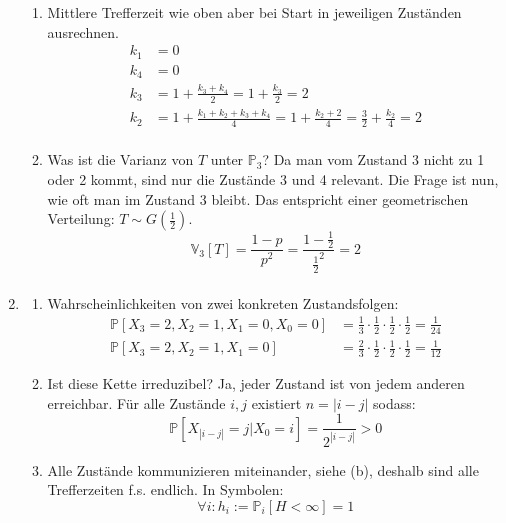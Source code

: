 \documentclass[a4paper,11pt,notitlepage,fullpage]{article}
\newcommand{\p}{\mathbb P}
\newcommand{\pp}[1]{\mathbb P\left[#1\right]}
\newcommand{\ppp}[2]{\mathbb P_#1\left[#2\right]}
\newcommand{\V}{\mathbb V}
\begin{document}
\begin{enumerate}
\begin{enumerate}
\item Mittlere Trefferzeit wie oben aber bei Start in jeweiligen Zuständen ausrechnen.
\begin{align*}
k_1 &= 0 \\
k_4 &= 0 \\
k_3 &= 1 + \frac{k_3 + k_4}{2} = 1 + \frac{k_3}{2} = 2\\
k_2 &= 1 + \frac{k_1 + k_2 + k_3 + k_4}{4} = 1 + \frac{k_2 + 2}{4} = \frac{3}{2} + \frac{k_2}{4} = 2\\
\end{align*}

\item Was ist die Varianz von $T$ unter $\p_3$? Da man vom Zustand 3 nicht zu 1 oder 2 kommt, sind nur die Zustände 3 und 4 relevant. Die Frage ist nun, wie oft man im Zustand 3 bleibt. Das entspricht einer geometrischen Verteilung: $T \sim G\left(\frac{1}{2}\right)$. $$\V_3\left[T\right] = \frac{1-p}{p^2} = \frac{1-\frac{1}{2}}{\frac{1}{2}^2} = 2$$
\begin{align*}
\end{align*}
\end{enumerate}

\item 
\begin{enumerate}
\item Wahrscheinlichkeiten von zwei konkreten Zustandsfolgen:
\begin{align*}
\pp{X_3 = 2, X_2 = 1, X_1 = 0, X_0 = 0} &= \frac{1}{3}\cdot\frac{1}{2}\cdot\frac{1}{2}\cdot\frac{1}{2} = \frac{1}{24} \\
\pp{X_3 = 2, X_2 = 1, X_1 = 0} &= \frac{2}{3}\cdot\frac{1}{2}\cdot\frac{1}{2}\cdot\frac{1}{2} = \frac{1}{12}
\end{align*}

\item Ist diese Kette irreduzibel? Ja, jeder Zustand ist von jedem anderen erreichbar. Für alle Zustände $i, j$ existiert $n = |i-j|$ sodass: $$\pp{X_{|i-j|} = j | X_0 = i} = \frac{1}{2^{|i-j|}} > 0$$

\item Alle Zustände kommunizieren miteinander, siehe (b), deshalb sind alle Trefferzeiten f.s. endlich. In Symbolen: $$\forall i : h_i := \ppp{i}{H < \infty} = 1$$


\end{enumerate}
\end{enumerate}
\end{document}
